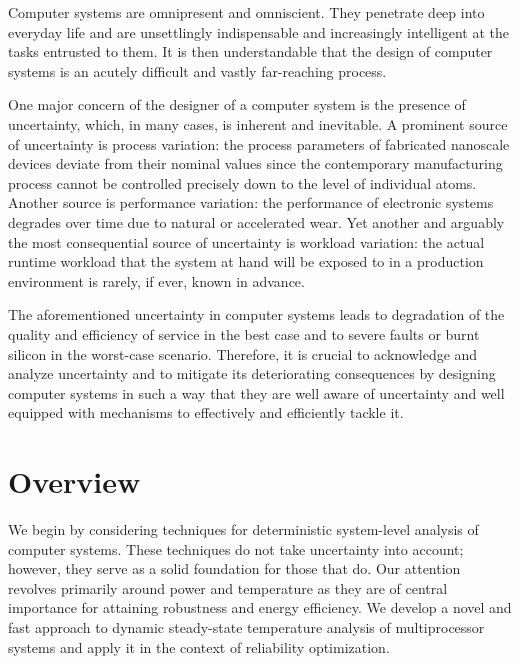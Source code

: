 Computer systems are omnipresent and omniscient. They penetrate deep into
everyday life and are unsettlingly indispensable and increasingly intelligent at
the tasks entrusted to them. It is then understandable that the design of
computer systems is an acutely difficult and vastly far-reaching process.

One major concern of the designer of a computer system is the presence of
uncertainty, which, in many cases, is inherent and inevitable. A prominent
source of uncertainty is process variation: the process parameters of fabricated
nanoscale devices deviate from their nominal values since the contemporary
manufacturing process cannot be controlled precisely down to the level of
individual atoms. Another source is performance variation: the performance of
electronic systems degrades over time due to natural or accelerated wear. Yet
another and arguably the most consequential source of uncertainty is workload
variation: the actual runtime workload that the system at hand will be exposed
to in a production environment is rarely, if ever, known in advance.

The aforementioned uncertainty in computer systems leads to degradation of the
quality and efficiency of service in the best case and to severe faults or burnt
silicon in the worst-case scenario. Therefore, it is crucial to acknowledge and
analyze uncertainty and to mitigate its deteriorating consequences by designing
computer systems in such a way that they are well aware of uncertainty and well
equipped with mechanisms to effectively and efficiently tackle it.

\section{Overview}

We begin by considering techniques for deterministic system-level analysis of
computer systems. These techniques do not take uncertainty into account;
however, they serve as a solid foundation for those that do. Our attention
revolves primarily around power and temperature as they are of central
importance for attaining robustness and energy efficiency. We develop a novel
and fast approach to dynamic steady-state temperature analysis of multiprocessor
systems and apply it in the context of reliability optimization.

